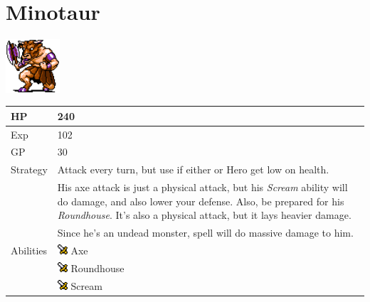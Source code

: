 \section{Minotaur}
\label{monster:minotaur}

\includegraphics[height=2cm,keepaspectratio]{./resources/monster/minotaur}

\begin{longtable}{ l p{9cm} }
	HP
	& 240
\\ \hline
	Exp
	& 102
\\ \hline
	GP
	& 30
\\ \hline
	Strategy
	& Attack every turn, but use \nameref{spell:cure} if either \nameref{char:kaeli} or Hero get low on health. \\
	& His axe attack is just a physical attack, but his \textit{Scream} ability will do damage, and also lower your defense. Also, be prepared for his \textit{Roundhouse}. It's also a physical attack, but it lays heavier damage. \\
	& Since he's an undead monster, \nameref{spell:life} spell will do massive damage to him.
\\ \hline
	Abilities
	& \includegraphics[height=1em,keepaspectratio]{./resources/effects/damage} Axe \\
	& \includegraphics[height=1em,keepaspectratio]{./resources/effects/damage} Roundhouse \\
	& \includegraphics[height=1em,keepaspectratio]{./resources/effects/damage} Scream
\end{longtable}
